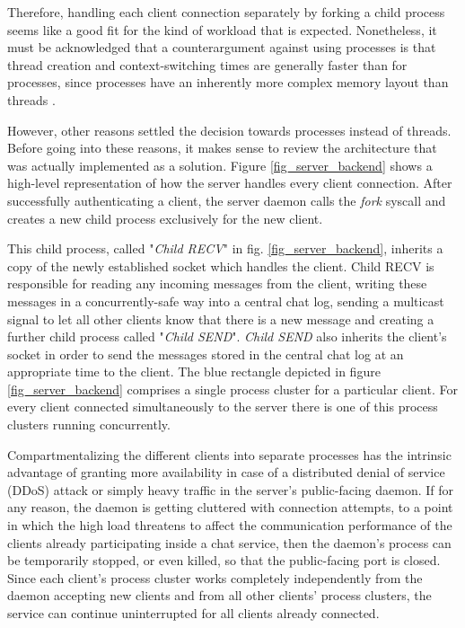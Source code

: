 Therefore, handling each client connection separately by forking a child process seems like a good fit for the kind of workload that is expected. Nonetheless, it must be acknowledged that a counterargument against using processes is that thread creation and context-switching times are generally faster than for processes, since processes have an inherently more complex memory layout than threads \cite{Kerrisk2010}.

However, other reasons settled the decision towards processes instead of threads. Before going into these reasons, it makes sense to review the architecture that was actually implemented as a solution. Figure \ref{fig_server_backend} shows a high-level representation of how the server handles every client connection. After successfully authenticating a client, the server daemon calls the \textit{fork} syscall and creates a new child process exclusively for the new client.
 
This child process, called "\textit{Child RECV}" in fig. \ref{fig_server_backend}, inherits a copy of the newly established socket which handles the client. Child RECV is responsible for reading any incoming messages from the client, writing these messages in a concurrently-safe way into a central chat log, sending a multicast signal to let all other clients know that there is a new message and creating a further child process called "\textit{Child SEND}". \textit{Child SEND} also inherits the client's socket in order to send the messages stored in the central chat log at an appropriate time to the client. The blue rectangle depicted in figure \ref{fig_server_backend} comprises a single process cluster for a particular client. For every client connected simultaneously to the server there is one of this process clusters running concurrently.

 Compartmentalizing the different clients into separate processes has the intrinsic advantage of granting more availability in case of a distributed denial of service (DDoS) attack or simply heavy traffic in the server's public-facing daemon. If for any reason, the daemon is getting cluttered with connection attempts, to a point in which the high load threatens to affect the communication performance of the clients already participating inside a chat service, then the daemon's process can be temporarily stopped, or even killed, so that the public-facing port is closed. Since each client's process cluster works completely independently from the daemon accepting new clients and from all other clients' process clusters, the service can continue uninterrupted for all clients already connected. 
 
